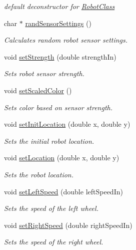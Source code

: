 \begin{DoxyCompactItemize}
\begin{DoxyCompactList}\small\item\em default deconstructor for \hyperlink{classRobotClass}{Robot\-Class} \end{DoxyCompactList}\item 
char $\ast$ \hyperlink{classRobotClass_accb083a3e0371d3a30f228d4acc49fad}{rand\-Sensor\-Settings} ()
\begin{DoxyCompactList}\small\item\em Calculates random robot sensor settings. \end{DoxyCompactList}\item 
void \hyperlink{classRobotClass_a56b10738037c31923df7f8d9fbc3e55d}{set\-Strength} (double strength\-In)
\begin{DoxyCompactList}\small\item\em Sets robot sensor strength. \end{DoxyCompactList}\item 
void \hyperlink{classRobotClass_afe213f4eb19cb904f5a4c10ebb9b7db8}{set\-Scaled\-Color} ()
\begin{DoxyCompactList}\small\item\em Sets color based on sensor strength. \end{DoxyCompactList}\item 
void \hyperlink{classRobotClass_a6e4902a26041b33ed83932a4514bb8c0}{set\-Init\-Location} (double x, double y)
\begin{DoxyCompactList}\small\item\em Sets the initial robot location. \end{DoxyCompactList}\item 
void \hyperlink{classRobotClass_a264d12c67f65e3eef63a0e90a3b902b1}{set\-Location} (double x, double y)
\begin{DoxyCompactList}\small\item\em Sets the robot location. \end{DoxyCompactList}\item 
void \hyperlink{classRobotClass_ac97314ad632887074ca7c8e92e4e602e}{set\-Left\-Speed} (double left\-Speed\-In)
\begin{DoxyCompactList}\small\item\em Sets the speed of the left wheel. \end{DoxyCompactList}\item 
void \hyperlink{classRobotClass_a6583cda55bd2f4d85ca7e55377730e1c}{set\-Right\-Speed} (double right\-Speed\-In)
\begin{DoxyCompactList}\small\item\em Sets the speed of the right wheel. \end{DoxyCompactList}\item 

\end{DoxyCompactItemize}
